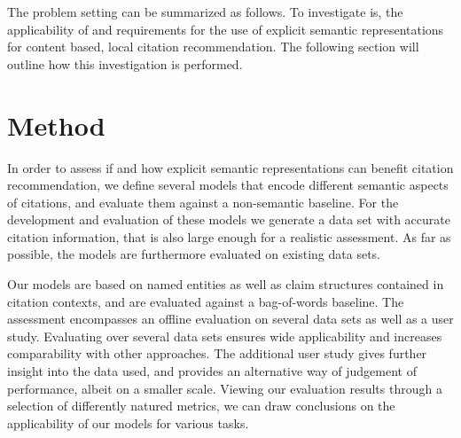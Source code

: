 The problem setting can be summarized as follows. To investigate is, the applicability of and requirements for the use of explicit semantic representations for content based, local citation recommendation. The following section will outline how this investigation is performed.

\section{Method}\label{sec:method}
In order to assess if and how explicit semantic representations can benefit citation recommendation, we define several models that encode different semantic aspects of citations, and evaluate them against a non-semantic baseline. For the development and evaluation of these models we generate a data set with accurate citation information, that is also large enough for a realistic assessment. As far as possible, the models are furthermore evaluated on existing data sets.

Our models are based on named entities as well as claim structures contained in citation contexts, and are evaluated against a bag-of-words baseline. The assessment encompasses an offline evaluation on several data sets as well as a user study. Evaluating over several data sets ensures wide applicability and increases comparability with other approaches. The additional user study gives further insight into the data used, and provides an alternative way of judgement of performance, albeit on a smaller scale. Viewing our evaluation results through a selection of differently natured metrics, we can draw conclusions on the applicability of our models for various tasks.

